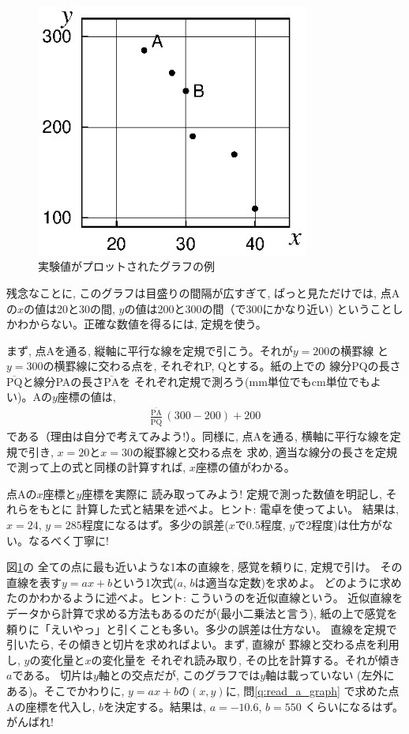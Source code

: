 \begin{figure}[h]
    \centering
    \includegraphics[width=9cm]{read_a_graph.eps}
    \caption{実験値がプロットされたグラフの例}\label{fig:read_a_graph}
\end{figure}

残念なことに, このグラフは目盛りの間隔が広すぎて, ぱっと見ただけでは, 
点Aの$x$の値は20と30の間, $y$の値は200と300の間（で300にかなり近い)
ということしかわからない。正確な数値を得るには, 定規を使う。

まず, 点Aを通る, 縦軸に平行な線を定規で引こう。それが$y=200$の横罫線
と$y=300$の横罫線に交わる点を, それぞれP, Qとする。紙の上での
線分PQの長さ$\overline{\text{PQ}}$と線分PAの長さ$\overline{\text{PA}}$を
それぞれ定規で測ろう(mm単位でもcm単位でもよい)。Aの$y$座標の値は, 
\begin{eqnarray}
\frac{\overline{\text{PA}}}{\overline{\text{PQ}}}\,(300-200)+200
\end{eqnarray}
である（理由は自分で考えてみよう!）。同様に, 点Aを通る, 
横軸に平行な線を定規で引き, $x=20$と$x=30$の縦罫線と交わる点を
求め, 適当な線分の長さを定規で測って上の式と同様の計算すれば, 
$x$座標の値がわかる。\mv

\begin{q}\label{q:read_a_graph} 点Aの$x$座標と$y$座標を実際に
読み取ってみよう! 定規で測った数値を明記し, それらをもとに
計算した式と結果を述べよ。{\small ヒント: 電卓を使ってよい。
結果は, $x=24$, $y=285$程度になるはず。多少の誤差($x$で0.5程度, 
$y$で2程度)は仕方がない。なるべく丁寧に!}\end{q}\mv

\begin{q}\label{q:read_a_graph_line} 図\ref{fig:read_a_graph}の
全ての点に最も近いような1本の直線を, 感覚を頼りに, 定規で引け。
その直線を表す$y=ax+b$という1次式($a$, $b$は適当な定数)を求めよ。
どのように求めたのかわかるように述べよ。{\small ヒント: こういうのを近似直線という。
近似直線をデータから計算で求める方法もあるのだが(最小二乗法と言う), 
紙の上で感覚を頼りに「えいやっ」と引くことも多い。多少の誤差は仕方ない。
直線を定規で引いたら, その傾きと切片を求めればよい。まず, 直線が
罫線と交わる点を利用し, $y$の変化量と$x$の変化量を
それぞれ読み取り, その比を計算する。それが傾き$a$である。
切片は$y$軸との交点だが, このグラフでは$y$軸は載っていない
(左外にある)。そこでかわりに, $y=ax+b$の$(x, y)$に, 問\ref{q:read_a_graph}
で求めた点Aの座標を代入し, $b$を決定する。結果は, $a=-10.6$, $b=550$
くらいになるはず。がんばれ!}
\end{q}
\hv



